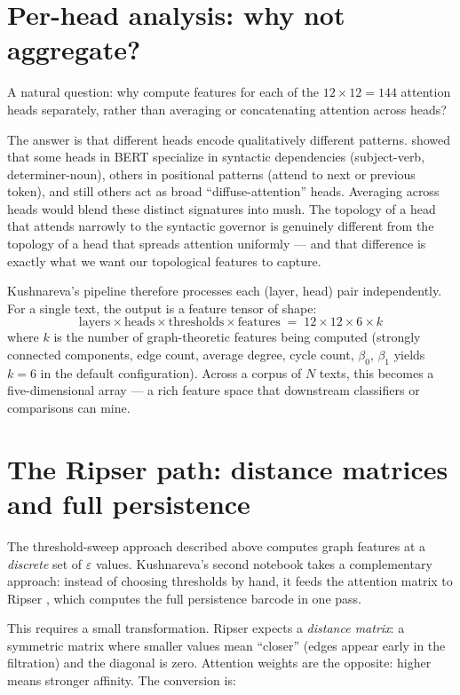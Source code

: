 \section{Per-head analysis: why not aggregate?}
\label{sec:per-head}

A natural question: why compute features for each of the $12 \times 12 = 144$
attention heads separately, rather than averaging or concatenating attention
across heads?

The answer is that different heads encode qualitatively different patterns.
\textcite{clark2019} showed that some heads in BERT specialize in syntactic
dependencies (subject-verb, determiner-noun), others in positional patterns
(attend to next or previous token), and still others act as broad
``diffuse-attention'' heads.  Averaging across heads would blend these
distinct signatures into mush.  The topology of a head that attends narrowly
to the syntactic governor is genuinely different from the topology of a head
that spreads attention uniformly --- and that difference is exactly what we want
our topological features to capture.

Kushnareva's pipeline therefore processes each (layer, head) pair independently.
For a single text, the output is a feature tensor of shape:
\[
  \text{layers} \times \text{heads} \times \text{thresholds} \times
  \text{features}
  \;=\; 12 \times 12 \times 6 \times k
\]
where $k$ is the number of graph-theoretic features being computed (strongly
connected components, edge count, average degree, cycle count, $\beta_0$, $\beta_1$
yields $k = 6$ in the default configuration).  Across a corpus of $N$ texts,
this becomes a five-dimensional array --- a rich feature space that downstream
classifiers or comparisons can mine.

\section{The Ripser path: distance matrices and full persistence}
\label{sec:ripser-path}

The threshold-sweep approach described above computes graph features at a
\emph{discrete} set of $\varepsilon$ values.  Kushnareva's second notebook
takes a complementary approach: instead of choosing thresholds by hand, it
feeds the attention matrix to Ripser \parencite{bauer2021}, which computes
the full persistence barcode in one pass.

This requires a small transformation.  Ripser expects a \emph{distance matrix}:
a symmetric matrix where smaller values mean ``closer'' (edges appear early
in the filtration) and the diagonal is zero.  Attention weights are the
opposite: higher means stronger affinity.  The conversion is:

